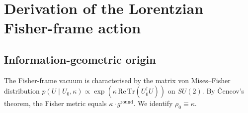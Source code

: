 \documentclass[12pt]{article}
\theoremstyle{definition}
\theoremstyle{remark}
\begin{document}
\begin{abstract}
\emph{Stage~6} derives the electroweak embedding.  The full symmetry of the
Fisher-frame action is $SU(2)_L\times\mathrm{U}(1)_Y$; axis selection is the
Higgs mechanism; the right-handed electron is the right-handed Weyl component
of the Dirac defect with $(T_3,Y)=(0,-1)$ from the Gell-Mann--Nishijima
relation; $\rho=1$ at tree level; $\sin^2\theta_W(m_P)=1/3$ from the
$\mathrm{U}(1)_Y$ escape cost; multi-generation running gives
$\sin^2\theta_W(M_Z)\approx 0.235$, within $1.6\%$ of the empirical value.

\emph{Stage~7} conditionally identifies the three-generation structure from
the electromagnetic running constraint.  The ratio
$R=\alpha_{\mathrm{em}}(m_e)/\alpha_{\mathrm{em}}(m_P)=16\pi^2/137\approx 1.14$
constrains the $SU(2)_L$ beta coefficient to $b_2\approx 3.1$; the Standard
Model formula $b_2=\tfrac{22}{3}-\tfrac{4N_g}{3}-\tfrac{1}{6}$ gives the
unique solution $N_g=3$.  The UV fine structure constant
$\alpha_{\mathrm{em}}(m_P)=1/(16\pi^2)$ is derived purely from topology.
The two-loop beta-function coefficient $b_1=40/3$ is computed; the
scheme-dependent shift to $\Lambda_{\overline{\mathrm{MS}}}$ is a scheme
artefact leaving the RGI mass prediction unchanged; the two-loop correction
to the Weinberg angle brackets the empirical value together with threshold
corrections.  Electromagnetically neutral defect sectors are identified as
dark matter candidates.  An appendix discusses the ontological status of the
information vacuum under three interpretive positions of increasing strength.
\end{abstract}

\tableofcontents\bigskip

\section{Derivation of the Lorentzian Fisher-frame action}
\label{sec:action}

\subsection{Information-geometric origin}

The Fisher-frame vacuum is characterised by the matrix von Mises--Fisher
distribution $p(U\mid U_0,\kappa)\propto\exp(\kappa\,\mathrm{Re}\,\mathrm{Tr}(U_0^\dagger U))$
on $SU(2)$.  By \v{C}encov's theorem, the Fisher metric equals
$\kappa\cdot g^{\mathrm{round}}$.  We identify $\rho_0\equiv\kappa$.
\end{document}
